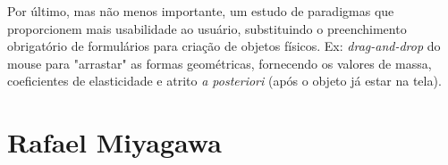Por último, mas não menos importante, um estudo de paradigmas que proporcionem mais usabilidade ao usuário, substituindo o preenchimento obrigatório de formulários para criação de objetos físicos. Ex: \textit{drag-and-drop} do mouse para "arrastar" as formas geométricas, fornecendo os valores de massa, coeficientes de elasticidade e atrito \textit{a posteriori} (após o objeto já estar na tela).\\


\section{Rafael Miyagawa}

